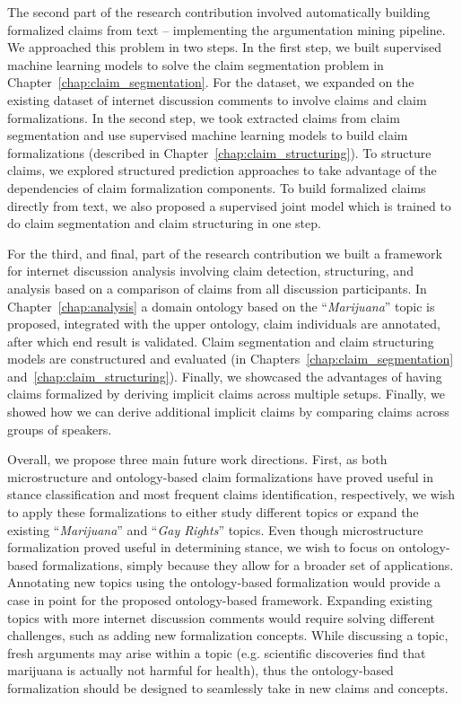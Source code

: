 The second part of the research contribution involved automatically building
formalized claims from text -- implementing the argumentation mining pipeline. 
We approached this problem in two steps.  In the first step, we built supervised
machine learning models to solve the claim segmentation problem in
Chapter~\ref{chap:claim_segmentation}.  For the dataset, we expanded on the existing
dataset of internet discussion comments \citep{hasan2014you} to involve claims
and claim formalizations.  In the second step, we took extracted claims from
claim segmentation and use supervised machine learning models to build claim
formalizations (described in Chapter~\ref{chap:claim_structuring}). To
structure claims, we explored structured prediction approaches to take advantage
of the dependencies of claim formalization components.  To build formalized
claims directly from text, we also proposed a supervised joint model which is
trained to do claim segmentation and claim structuring in one step. 

For the third, and final, part of the research contribution we built a framework
for internet discussion analysis involving claim detection,
structuring, and analysis based on a comparison of claims from all discussion
participants. In Chapter~\ref{chap:analysis} a domain ontology based 
on the ``\emph{Marijuana}'' topic is proposed, integrated with the upper ontology,
claim individuals are annotated, after which end result is validated. 
Claim segmentation and claim structuring models are constructured and evaluated (in
Chapters~\ref{chap:claim_segmentation} and~\ref{chap:claim_structuring}). 
Finally, we showcased the advantages of having claims
formalized by deriving implicit claims across multiple setups. 
Finally, we showed how we can derive additional implicit claims by comparing
claims across groups of speakers. 

Overall, we propose three main future work directions.  First, as both
microstructure and ontology-based claim formalizations have proved useful in stance
classification and most frequent claims identification, respectively, we wish to
apply these formalizations to either study different topics or expand the existing
``\emph{Marijuana}'' and ``\emph{Gay Rights}'' topics. Even though
microstructure formalization proved useful in determining stance, we wish to focus
on ontology-based formalizations, simply because they allow for a broader set
of applications. Annotating new topics using the ontology-based formalization
would provide a case in point for the proposed ontology-based framework.
Expanding existing topics with more internet discussion comments would require
solving different challenges, such as adding new formalization concepts. While
discussing a topic, fresh arguments may arise within a topic (e.g. scientific
discoveries find that marijuana is actually not harmful for
health), thus the ontology-based formalization should be designed to seamlessly take in
new claims and concepts. 

